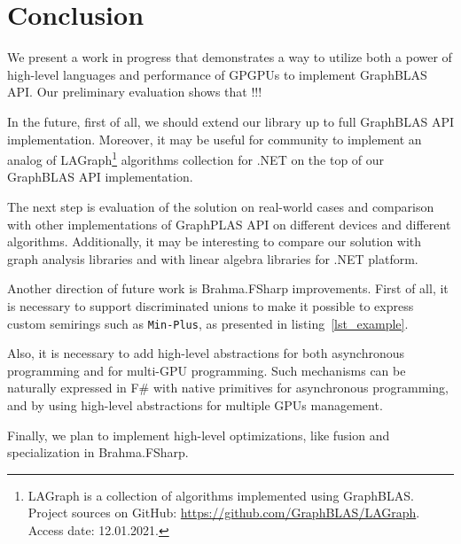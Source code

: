 \section{Conclusion}

We present a work in progress that demonstrates a way to utilize both a power of high-level languages and performance of GPGPUs to implement GraphBLAS API.
Our preliminary evaluation shows that !!!

In the future, first of all, we should extend our library up to full GraphBLAS API implementation.
Moreover, it may be useful for community to implement an analog of LAGraph\footnote{LAGraph is a collection of algorithms implemented using GraphBLAS. Project sources on GitHub: \url{https://github.com/GraphBLAS/LAGraph}. Access date: 12.01.2021.} algorithms collection for .NET on the top of our GraphBLAS API implementation.

The next step is evaluation of the solution on real-world cases and comparison with other implementations of GraphPLAS API on different devices and different algorithms.
Additionally, it may be interesting to compare our solution with graph analysis libraries and with linear algebra libraries for .NET platform.

Another direction of future work is Brahma.FSharp improvements. 
First of all, it is necessary to support discriminated unions to make it possible to express custom semirings such as \texttt{Min-Plus}, as presented in listing~\ref{lst_example}. 

Also, it is necessary to add high-level abstractions for both asynchronous programming and for multi-GPU programming.
Such mechanisms can be naturally expressed in F\# with native primitives for asynchronous programming, and by using high-level abstractions for multiple GPUs management.

Finally, we plan to implement high-level optimizations, like fusion and specialization in Brahma.FSharp.


